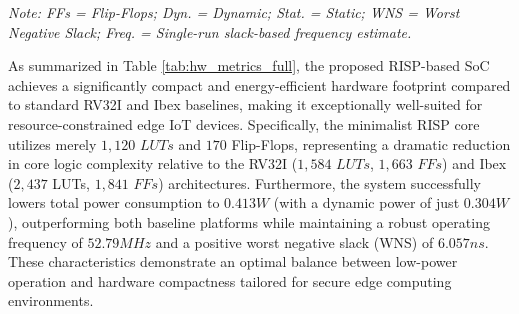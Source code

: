 \begin{table}[!t]
\centering
\caption{Hardware Resource and Performance Metrics}
\label{tab:hw_metrics_full}
\small
{}
\vspace{1pt}
\raggedright
\footnotesize\textit{Note: FFs = Flip-Flops; Dyn. = Dynamic; Stat. = Static; WNS = Worst Negative Slack; Freq. = Single-run slack-based frequency estimate.}
\end{table}

As summarized in Table \ref{tab:hw_metrics_full}, the proposed RISP-based SoC achieves a significantly compact and energy-efficient hardware footprint compared to standard RV32I and Ibex baselines, making it exceptionally well-suited for resource-constrained edge IoT devices. Specifically, the minimalist RISP core utilizes merely $1,120$ $LUTs$ and $170$ Flip-Flops, representing a dramatic reduction in core logic complexity relative to the RV32I ($1,584$ $LUTs$, $1,663$ $FFs$) and Ibex ($2,437$ LUTs, $1,841$ $FFs$) architectures. Furthermore, the system successfully lowers total power consumption to $0.413 W$ (with a dynamic power of just $0.304 W$), outperforming both baseline platforms while maintaining a robust operating frequency of $52.79 MHz$ and a positive worst negative slack (WNS) of $6.057 ns$. These characteristics demonstrate an optimal balance between low-power operation and hardware compactness tailored for secure edge computing environments.

